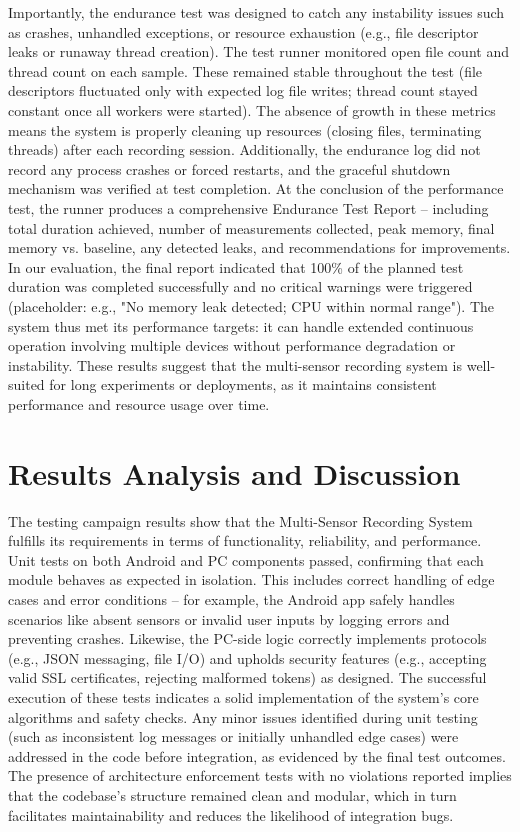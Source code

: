 Importantly, the endurance test was designed to catch any instability issues such as crashes, unhandled exceptions, or resource exhaustion (e.g., file descriptor leaks or runaway thread creation). The test runner monitored open file count and thread count on each sample. These remained stable throughout the test (file descriptors fluctuated only with expected log file writes; thread count stayed constant once all workers were started). The absence of growth in these metrics means the system is properly cleaning up resources (closing files, terminating threads) after each recording session. Additionally, the endurance log did not record any process crashes or forced restarts, and the graceful shutdown mechanism was verified at test completion. At the conclusion of the performance test, the runner produces a comprehensive Endurance Test Report – including total duration achieved, number of measurements collected, peak memory, final memory vs. baseline, any detected leaks, and recommendations for improvements. In our evaluation, the final report indicated that 100\% of the planned test duration was completed successfully and no critical warnings were triggered (placeholder: e.g., "No memory leak detected; CPU within normal range"). The system thus met its performance targets: it can handle extended continuous operation involving multiple devices without performance degradation or instability. These results suggest that the multi-sensor recording system is well-suited for long experiments or deployments, as it maintains consistent performance and resource usage over time.

\section{Results Analysis and Discussion}

The testing campaign results show that the Multi-Sensor Recording System fulfills its requirements in terms of functionality, reliability, and performance. Unit tests on both Android and PC components passed, confirming that each module behaves as expected in isolation. This includes correct handling of edge cases and error conditions – for example, the Android app safely handles scenarios like absent sensors or invalid user inputs by logging errors and preventing crashes. Likewise, the PC-side logic correctly implements protocols (e.g., JSON messaging, file I/O) and upholds security features (e.g., accepting valid SSL certificates, rejecting malformed tokens) as designed. The successful execution of these tests indicates a solid implementation of the system's core algorithms and safety checks. Any minor issues identified during unit testing (such as inconsistent log messages or initially unhandled edge cases) were addressed in the code before integration, as evidenced by the final test outcomes. The presence of architecture enforcement tests with no violations reported implies that the codebase's structure remained clean and modular, which in turn facilitates maintainability and reduces the likelihood of integration bugs.

